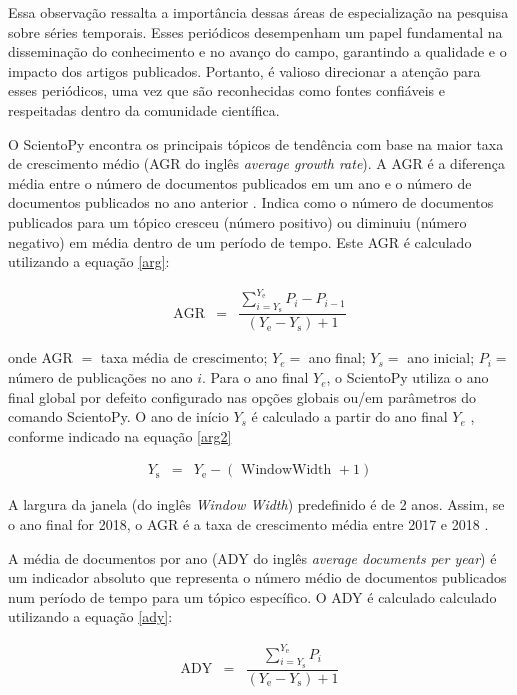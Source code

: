 Essa observação ressalta a importância dessas áreas de especialização na pesquisa sobre séries temporais. Esses periódicos desempenham um papel fundamental na disseminação do conhecimento e no avanço do campo, garantindo a qualidade e o impacto dos artigos publicados. Portanto, é valioso direcionar a atenção para esses periódicos, uma vez que são reconhecidas como fontes confiáveis e respeitadas dentro da comunidade científica.


O ScientoPy encontra os principais tópicos de tendência com base na maior taxa de crescimento médio (AGR do inglês \textit{average growth rate}). A AGR é a diferença média entre o número de documentos publicados em um ano e o número de documentos publicados no ano anterior \cite{scientopy}. Indica como o número de documentos publicados para um tópico cresceu (número positivo) ou diminuiu (número negativo) em média dentro de um período de tempo. Este AGR é calculado utilizando a equação \eqref{arg}:


\begin{eqnarray}
	\mathrm{AGR}&=&\dfrac{\sum_{i=Y_{\mathrm{s}}}^{Y_{\mathrm{e}}} P_i-P_{i-1}}{\left(Y_{\mathrm{e}}-Y_{\mathrm{s}}\right)+1} \label{arg}
\end{eqnarray}

\noindent onde AGR $=$ taxa média de crescimento; $Y_e =$ ano final; $Y_s =$ ano inicial; $P_i =$ número de publicações no ano $i$.
Para o ano final $Y_e$, o ScientoPy utiliza o ano final global por defeito configurado nas opções globais ou/em parâmetros do comando ScientoPy. O ano de início $Y_s$ é calculado a partir do ano final $Y_e$ , conforme indicado na equação \eqref{arg2}

\begin{eqnarray}
	Y_{\mathrm{s}}&=&Y_{\mathrm{e}}-(\text { WindowWidth }+1)\label{arg2}
\end{eqnarray}

A largura da janela (do inglês \textit{Window Width}) predefinido é de 2 anos. Assim, se o ano final for 2018, o AGR é a taxa de crescimento média entre 2017 e 2018 \cite{scientopy}.

A média de documentos por ano (ADY do inglês \textit{average documents per year}) é um indicador absoluto que representa o número médio de documentos publicados num período de tempo para um tópico específico. O ADY é calculado calculado utilizando a equação \eqref{ady}:

\begin{eqnarray}
	\mathrm{ADY}&=&\dfrac{\sum_{i=Y_{\mathrm{s}}}^{Y_{\mathrm{e}}} P_i}{\left(Y_{\mathrm{e}}-Y_{\mathrm{s}}\right)+1}\label{ady}
\end{eqnarray}

